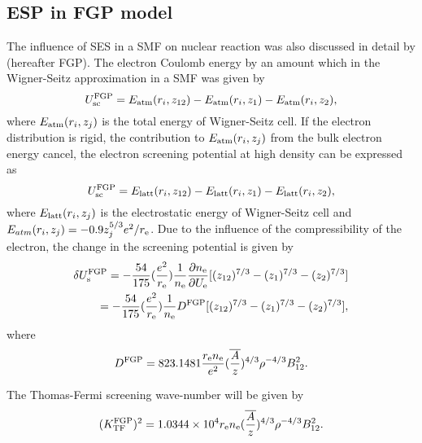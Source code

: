 \documentclass[manuscript]{aastex}
\begin{document}
\subsection{ESP in FGP model}
The influence of SES in a SMF on nuclear reaction was also discussed
in detail by \citet{Fushiki89} (hereafter FGP). The electron Coulomb
energy by an amount which in the Wigner-Seitz approximation in a SMF
was given by
\begin{equation}
U_{\rm{sc}}^{\rm{FGP}}=E_{\rm{atm}}(r_{i},z_{12})-E_{\rm{atm}}(r_{i},z_1)-E_{\rm{atm}}(r_{i},z_2),
\label{28}
\end{equation}
where $E_{\rm{atm}}(r_{i}, z_{j})$ is the total energy of
Wigner-Seitz cell. If the electron distribution is rigid, the
contribution to $E_{\rm{atm}}(r_{i}, z_{j})$ from the bulk electron
energy cancel, the electron screening potential at high density can
be expressed as
\begin{equation}
U_{\rm{sc}}^{\rm{FGP}}=E_{\rm{latt}}(r_{i},z_{12})-E_{\rm{latt}}(r_{i},z_1)-E_{\rm{latt}}(r_{i},z_2),
\label{29}
\end{equation}
where $E_{\rm{latt}}(r_i, z_j)$ is the electrostatic
 energy of Wigner-Seitz cell and $E_{atm}(r_{i}, z_{j})=-0.9z_{j}^{5/3}e^2/r_{\rm{e}}$.
Due to the influence of the compressibility of the electron, the
change in the screening potential is given by \citep{Fushiki89}
\begin{eqnarray}
 \delta U_{\rm{s}}^{\rm{FGP}}=-\frac{54}{175}(\frac{e^2}{r_{\rm{e}}})\frac{1}{n_{\rm{e}}}\frac{\partial n_{\rm{e}}}{\partial U_{\rm{e}}}[(z_{12})^{7/3}-(z_{1})^{7/3}-(z_{2})^{7/3}]\nonumber \\
 =-\frac{54}{175}(\frac{e^2}{r_{\rm{e}}})\frac{1}{n_{\rm{e}}}D^{\rm{FGP}}[(z_{12})^{7/3}-(z_{1})^{7/3}-(z_{2})^{7/3}],
\label{30}
\end{eqnarray}
where
\begin{equation}
 D^{\rm{FGP}}=823.1481\frac{r_{\rm{e}}n_{\rm{e}}}{e^2}(\overline{\frac{A}{z}})^{4/3}\rho^{-4/3}B_{12}^2.
\label{31}
\end{equation}

The Thomas-Fermi screening wave-number will be given by
\begin{equation}
 (K_{\rm{TF}}^{\rm{FGP}})^2=1.0344\times 10^4 r_{\rm{e}}n_{\rm{e}}(\overline{\frac{A}{z}})^{4/3}\rho^{-4/3}B_{12}^2.
\label{32}
\end{equation}
\end{document}
